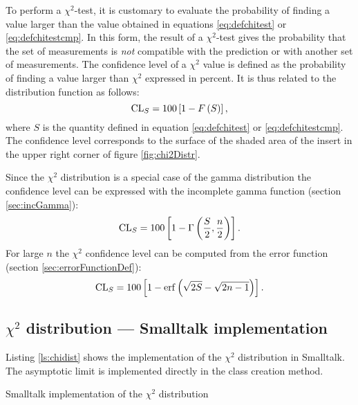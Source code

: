\documentclass[twoside]{book}
\begin{document}
To perform a $\chi^2$-test, it is customary to evaluate the
probability of finding a value larger than the value obtained in
equations \ref{eq:defchitest} or \ref{eq:defchitestcmp}. In this
form, the result of a $\chi^2$-test gives the probability that the
set of measurements is {\sl not} compatible with the prediction or
with another set of measurements. The confidence level of a
$\chi^2$ value is defined as the probability of finding a value
larger than $\chi^2$ expressed in percent. It is thus related to
the distribution function as follows:
\begin{equation}
  {\mathop{\rm CL}}_{S}=100\left[ 1-F\left(S\right)\right],
\end{equation}
where $S$ is the quantity defined in equation \ref{eq:defchitest}
or \ref{eq:defchitestcmp}. The confidence level corresponds to the
surface of the shaded area of the insert in the upper right corner
of figure \ref{fig:chi2Distr}.

Since the $\chi^2$ distribution is a special case of the gamma
distribution the confidence level can be expressed with the
incomplete gamma function (\cf section \ref{sec:incGamma}):
\begin{equation}
\label{eq:chiTest}
  {\mathop{\rm CL}}_{S}=100\left[ 1-\Gamma\left({S \over 2},{n\over 2}\right)\right].
\end{equation}
For large $n$ the $\chi^2$ confidence level can be computed from
the error function (\cf section \ref{sec:errorFunctionDef}):
\begin{equation}
\label{eq:chiTestAsymp}
  {\mathop{\rm CL}}_{S}=100\left[ 1-\mathop{\rm erf}\left(\sqrt{2S}-\sqrt{2n-1}\right)\right].
\end{equation}

\subsection{$\chi^2$ distribution --- Smalltalk implementation}
 Listing \ref{ls:chidist} shows
the implementation of the $\chi^2$ distribution in Smalltalk. The
asymptotic limit is implemented directly in the class creation
method.
\begin{listing} Smalltalk implementation of the $\chi^2$ distribution \label{ls:chidist}

\end{listing}
\end{document}
